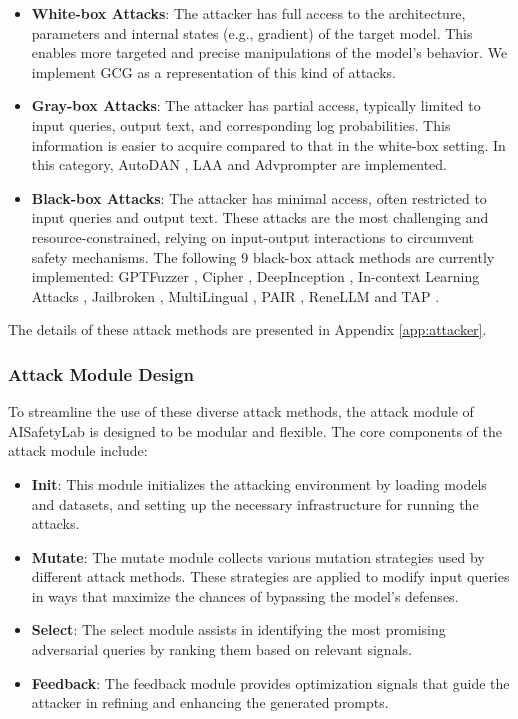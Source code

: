 \begin{itemize}
    \item \textbf{White-box Attacks}: The attacker has full access to the architecture, parameters and internal states (e.g., gradient) of the target model. This enables more targeted and precise manipulations of the model's behavior. We implement GCG \cite{DBLP:journals/corr/abs-2307-15043} as a representation of this kind of attacks.
    \item \textbf{Gray-box Attacks}: The attacker has partial access, typically limited to input 
    queries, output text, and corresponding log probabilities. This information is easier to acquire compared to that in the white-box setting. In this category, AutoDAN \cite{liu2023autodan}, LAA \cite{andriushchenko2024jailbreaking} and Advprompter\cite{paulus2024advprompter} are implemented.
    \item \textbf{Black-box Attacks}: The attacker has minimal access, often restricted to input queries and output text. These attacks are the most challenging and resource-constrained, 
    relying on input-output interactions to circumvent safety mechanisms. The following 9 black-box attack methods are currently implemented: GPTFuzzer \cite{yu2023gptfuzzer}, Cipher \cite{yuan2023toosmart}, DeepInception \cite{li2023deepinception}, In-context Learning Attacks \cite{ICD}, Jailbroken \cite{DBLP:journals/corr/abs-2307-02483}, MultiLingual \cite{deng2023multilingual}, PAIR \cite{chao2023jailbreaking}, ReneLLM \cite{ding2023wolf} and TAP \cite{mehrotra2023tree}.
\end{itemize}

The details of these attack methods are presented in Appendix \ref{app:attacker}.

\subsubsection{Attack Module Design}
To streamline the use of these diverse attack methods, the attack module of AISafetyLab is designed to be modular and flexible. The core components of the attack module include:

\begin{itemize}
    \item \textbf{Init}: This module initializes the attacking environment by loading models and datasets, and setting up the necessary infrastructure for running the attacks.
    \item \textbf{Mutate}: The mutate module collects various mutation strategies used by different attack methods. These strategies are applied to modify input queries in ways that maximize the chances of bypassing the model’s defenses.
    \item \textbf{Select}: The select module assists in identifying the most promising adversarial queries by ranking them based on relevant signals.
    \item \textbf{Feedback}: The feedback module provides optimization signals that guide the attacker in refining and enhancing the generated prompts.
\end{itemize}

